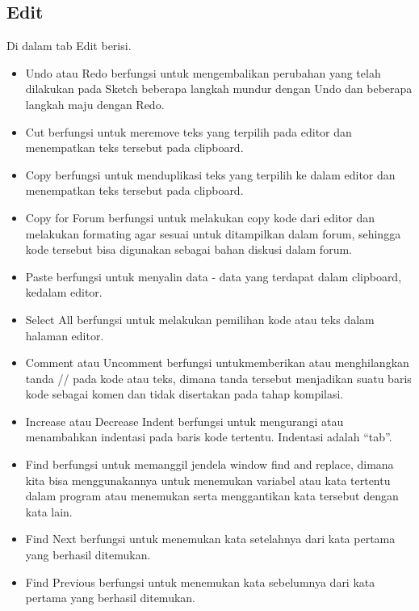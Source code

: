 \subsection{Edit}
Di dalam tab Edit berisi.
\begin{itemize}
\item Undo atau Redo berfungsi untuk mengembalikan perubahan yang telah dilakukan pada Sketch beberapa langkah mundur dengan Undo dan beberapa langkah maju dengan Redo.
\item Cut berfungsi untuk meremove teks yang terpilih pada editor dan menempatkan teks tersebut pada clipboard.
\item Copy berfungsi untuk menduplikasi teks yang terpilih ke dalam editor dan menempatkan teks tersebut pada clipboard.
\item Copy for Forum berfungsi untuk melakukan copy kode dari editor dan melakukan formating agar sesuai untuk ditampilkan dalam forum, sehingga kode tersebut bisa digunakan sebagai bahan diskusi dalam forum.
\item Paste berfungsi untuk menyalin data - data yang terdapat dalam clipboard, kedalam editor.
\item Select All berfungsi untuk melakukan pemilihan kode atau teks dalam halaman editor.
\item Comment atau Uncomment berfungsi untukmemberikan atau menghilangkan tanda // pada kode atau teks, dimana tanda tersebut menjadikan suatu baris kode sebagai komen dan tidak disertakan pada tahap kompilasi.
\item Increase atau Decrease Indent berfungsi untuk mengurangi atau menambahkan indentasi pada baris kode tertentu. Indentasi adalah “tab”.
\item Find berfungsi untuk memanggil jendela window find and replace, dimana kita bisa menggunakannya untuk menemukan variabel atau kata tertentu dalam program atau menemukan serta menggantikan kata tersebut dengan kata lain.
\item Find Next berfungsi untuk menemukan kata setelahnya dari kata pertama yang berhasil ditemukan.
\item Find Previous berfungsi untuk menemukan kata sebelumnya dari kata pertama yang berhasil ditemukan.
\end{itemize}	

 
